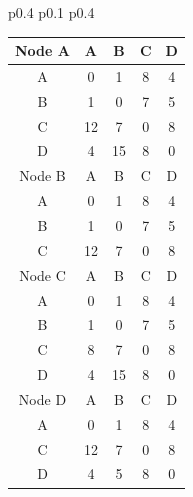 \documentclass{article}
\begin{document}
\begin{tabular}{p{0.4\linewidth} p{0.1\linewidth} p{0.4\linewidth}}
    \begin{tabular}{c|c|c|c|c}
        \hline
        Node A & A & B & C & D \\
        \hline
        A & 0 & 1 & 8 & 4 \\
        B & 1 & 0 & 7 & 5 \\
        C & 12 & 7 & 0 & 8 \\
        D & 4 & 15 & 8 & 0 \\
        \hline
        \hline
        Node B & A & B & C & D \\
        \hline 
        A & 0 & 1 & 8 & 4 \\
        B & 1 & 0 & 7 & 5 \\
        C & 12 & 7 & 0 & 8 \\
        \hline
        \hline
        Node C & A & B & C & D \\
        \hline
        A & 0 & 1 & 8 & 4 \\
        B & 1 & 0 & 7 & 5 \\
        C & \color{red}8 & 7 & 0 & 8 \\
        D & 4 & 15 & 8 & 0 \\
        \hline
        \hline
        Node D & A & B & C & D \\
        \hline
        A & 0 & 1 & 8 & 4 \\
        C & 12 & 7 & 0 & 8 \\
        D & 4 & \color{red}5 & 8 & 0 \\
        \hline


    \end{tabular}

\end{tabular}\\
\end{document}
